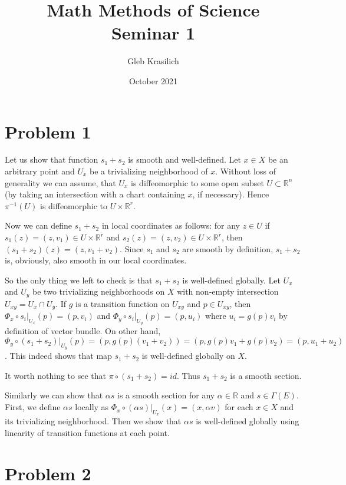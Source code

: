 \documentclass{article}[14pt]
\title{Math Methods of Science \\
Seminar 1}
\author{Gleb Krasilich}
\date{October 2021}
\begin{document}
\maketitle

\section{Problem 1}

Let us show that function $s_1 + s_2$ is smooth and well-defined.
Let $x \in X$ be an arbitrary point and $U_x$ be a trivializing neighborhood of $x$.
Without loss of generality we can assume, 
that $U_x$ is diffeomorphic to some open subset $ U \subset \mathbb R^n$ 
(by taking an intersection with a chart containing $x$, if necessary).
Hence $\pi^{-1} (U)$ is diffeomorphic to $U \times \mathbb R^r$.

Now we can define $s_1 + s_2$ in local coordinates as follows: 
for any $z \in U$ if $s_1(z) = (z, v_1) \in U \times \mathbb R^r$
and $s_2 (z) = (z, v_2) \in U \times \mathbb R^r$, 
then $(s_1 + s_2)(z) = (z, v_1 + v_2)$.
Since $s_1$ and $s_2$ are smooth by definition,
$s_1 + s_2$ is, obviously, also smooth in our local coordinates.

So the only thing we left to check is that $s_1 + s_2$ is well-defined globally.
Let $U_x$ and $U_y$ be two trivializing neighborhoods on $X$ with non-empty intersection
$U_{xy} = U_x \cap U_y$. If $g$ is a transition function on $U_{xy}$ and 
$p \in U_{xy}$, then $\Phi_x \circ s_i |_{U_x}(p) = (p, v_i)$ and
$\Phi_y \circ s_i |_{U_y}(p) = (p, u_i)$ where $u_i = g(p) v_i$ by definition of vector bundle.
On other hand, 
$\Phi_y \circ (s_1 + s_2) |_{U_y}(p) = (p, g(p)(v_1 + v_2)) = (p, g(p)v_1 + g(p)v_2) = (p, u_1 + u_2)$.
This indeed shows that map $s_1 + s_2$ is well-defined globally on $X$.

It worth nothing to see that $\pi \circ (s_1 + s_2) = id$. Thus $s_1 + s_2$ is a smooth section.

Similarly we can show that $\alpha s$ is a smooth section for any $\alpha \in \mathbb R$
and $s \in \Gamma(E)$. First, we define $\alpha s$ locally as 
$\Phi_x \circ (\alpha s) |_{U_x} (x) = (x, \alpha v)$ for each $x \in X$ and its trivializing neighborhood.
Then we show that $\alpha s$ is well-defined globally using linearity of transition functions at each point.

\section{Problem 2}
\end{document}
